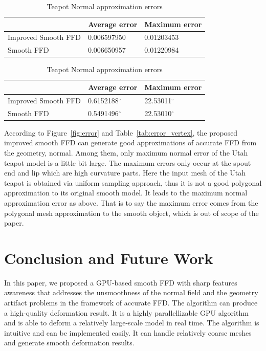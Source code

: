 \documentclass[3p]{elsarticle}
\begin{document}
\begin{table}[htbp]
\begin{center}
	\begin{minipage}[c]{0.47\textwidth}
	\footnotesize
	\centering
	\caption{Teapot Geometry approximation errors}
	\begin{tabular}{lll}
		\hline
		& Average error & Maximum error \\
		\hline
			Improved Smooth FFD & 0.006597950 & 0.01203453 \\
			Smooth FFD & 0.006650957 & 0.01220984 \\
		\hline
	\end{tabular}
	\label{tab:error_vertex}
	\end{minipage}
	\begin{minipage}[c]{0.52\textwidth}
	\footnotesize
	\centering
	\caption{Teapot Normal approximation errors}
	\begin{tabular}{lll}
		\hline
			& Average error & Maximum error \\
		\hline
			Improved Smooth FFD & 0.6152188$^\circ$ & 22.53011$^\circ$ \\
			Smooth FFD & 0.5491496$^\circ$ & 22.53010$^\circ$ \\
		\hline
	\end{tabular}
	\label{tab:error_normal}
	\end{minipage}
\end{center}
\end{table}

According to Figure~\ref{fig:error} and Table~\ref{tab:error_vertex}, the proposed improved smooth FFD can
generate good approximations of accurate FFD from the geometry, normal. Among them, only maximum
normal error of the Utah teapot model is a little bit large. The maximum errors only occur at the spout end and lip
which are high curvature parts. Here the input mesh of the Utah teapot is obtained via uniform sampling approach, thus
it is not a good polygonal approximation to its original smooth model. It leads to the maximum normal approximation
error as above. That is to say the maximum error comes from the polygonal mesh approximation to the smooth object, which
is out of scope of the paper.

\section{Conclusion and Future Work}

In this paper, we proposed a GPU-based smooth FFD with sharp features awareness that addresses the unsmoothness of the
normal field and the geometry artifact problems in the framework of accurate FFD. The algorithm can produce a
high-quality deformation result. It is a highly parallellizable GPU algorithm and is able to deform a relatively
large-scale model in real time. The algorithm is intuitive and can be implemented easily. It can handle relatively
coarse meshes and generate smooth deformation results.
\end{document}
